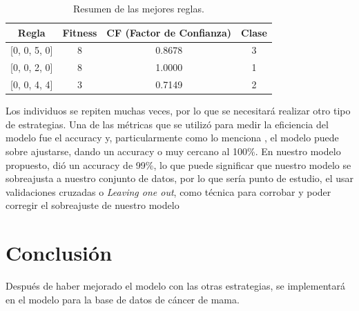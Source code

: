 \documentclass{article}
\begin{document}
\begin{table}[h!]
    \centering
    \begin{tabular}{@{}cccc@{}}
    \toprule
    \textbf{Regla}       & \textbf{Fitness} & \textbf{CF (Factor de Confianza)} & \textbf{Clase} \\ \midrule
    {[0, 0, 5, 0]}       & 8                & 0.8678                            & 3              \\
    {[0, 0, 2, 0]}       & 8                & 1.0000                            & 1              \\
    {[0, 0, 4, 4]}       & 3                & 0.7149                            & 2              \\ \bottomrule
    \end{tabular}
    \caption{Resumen de las mejores reglas.}
    \label{tab:best_rules}
\end{table}
Los individuos se repiten muchas veces, por lo que se necesitará realizar otro tipo de estrategias. 
Una de las métricas que se utilizó para medir la eficiencia del modelo fue el accuracy y, particularmente como lo menciona , el modelo puede sobre ajustarse, dando un accuracy o muy cercano al 100\%. En nuestro modelo propuesto, dió un accuracy de 99\%, lo que puede significar que nuestro modelo se sobreajusta a nuestro conjunto de datos, por lo que sería punto de estudio, el usar validaciones cruzadas o \textit{Leaving one out}, como técnica para corrobar y poder corregir el sobreajuste de nuestro modelo 
\section{Conclusión}
Después de haber mejorado el modelo con las otras estrategias, se implementará en el modelo para la base de datos de cáncer de mama.


\end{document}
